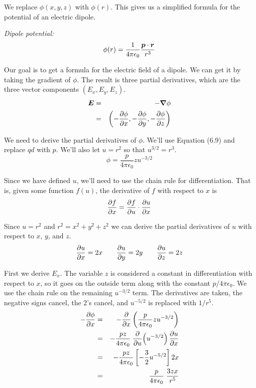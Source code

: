 We replace $\phi(x,y,z)$ with $\phi(r)$.
This gives us a simplified formula for the potential of an electric dipole.

\hspace{2em} \emph{Dipole potential:}
\vspace{-1.0em}
\begin{equation}
  \phi(r) = \frac{1}{4\pi\epsilon_0} \frac{\boldsymbol{p} \cdot \boldsymbol{r}}{r^3}
\end{equation}

Our goal is to get a formula for the electric field of a dipole.
We can get it by taking the gradient of $\phi$.
The result is three partial derivatives, which are the three vector components
$(E_x,E_y,E_z)$.
\begin{eqnarray*}
  \boldsymbol{E} &=& - \boldsymbol{\nabla} \phi \\
  &=& \left( -\frac{\partial \phi}{\partial x}, -\frac{\partial \phi}{\partial y}, -\frac{\partial \phi}{\partial z} \right)
\end{eqnarray*}

We need to derive the partial derivatives of $\phi$.
We'll use Equation (6.9) and replace $qd$ with $p$.
We'll also let $u=r^2$ so that $u^{3/2}=r^3$.
\begin{equation*}
  \phi = \frac{p}{4\pi\epsilon_0} z u^{-3/2}
\end{equation*}

Since we have defined $u$, we'll need to use the chain rule for differentiation.
That is, given some function $f(u)$, the derivative of $f$ with respect to $x$ is
\begin{equation*}
  \frac{\partial f}{\partial x} = \frac{\partial f}{\partial u} \cdot \frac{\partial u}{\partial x}
\end{equation*}

Since $u=r^2$ and $r^2=x^2+y^2+z^2$ we can derive the partial derivatives of $u$
with respect to $x$, $y$, and $z$.
\begin{equation*}
  \frac{\partial u}{\partial x} = 2x \qquad \frac{\partial u}{\partial y} = 2y \qquad \frac{\partial u}{\partial z} = 2z
\end{equation*}

First we derive $E_x$.
The variable $z$ is considered a constant in differentiation with respect to $x$,
so it goes on the outside term along with the constant $p/4\pi\epsilon_0$.
We use the chain rule on the remaining $u^{-3/2}$ term.
The derivatives are taken, the negative signs cancel, the 2's cancel, 
and $u^{-5/2}$ is replaced with $1/r^5$.
\begin{eqnarray*}
  -\frac{\partial \phi}{\partial x}
  &=& -\frac{\partial }{\partial x} \left( \frac{p}{4\pi\epsilon_0} z u^{-3/2} \right) \\
  &=& - \frac{pz}{4\pi\epsilon_0} \; \frac{\partial }{\partial u} \! \left( u^{-3/2} \right) \frac{\partial u}{\partial x} \\
  &=& - \frac{pz}{4\pi\epsilon_0} \left[-\frac{3}{2} u^{-5/2}\right] 2x \\
  &=& \frac{p}{4\pi\epsilon_0} \; \frac{3zx}{r^5}
\end{eqnarray*}

